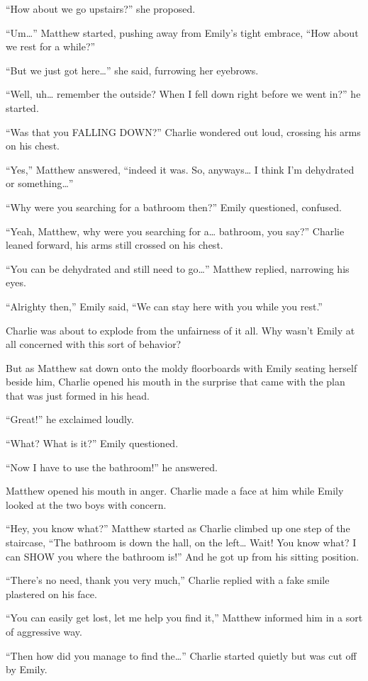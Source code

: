 “How about we go upstairs?” she proposed.

“Um…” Matthew started, pushing away from Emily's tight embrace, “How about we rest for a while?”

“But we just got here…” she said, furrowing her eyebrows.

“Well, uh… remember the outside? When I fell down right before we went in?” he started.

“Was that you FALLING DOWN?” Charlie wondered out loud, crossing his arms on his chest.

“Yes,” Matthew answered, “indeed it was. So, anyways… I think I'm dehydrated or something…”

“Why were you searching for a bathroom then?” Emily questioned, confused.

“Yeah, Matthew, why were you searching for a… bathroom, you say?” Charlie leaned forward, his arms still crossed on his chest.

“You can be dehydrated and still need to go…” Matthew replied, narrowing his eyes.

“Alrighty then,” Emily said, “We can stay here with you while you rest.”

Charlie was about to explode from the unfairness of it all. Why wasn't Emily at all concerned with this sort of behavior?

But as Matthew sat down onto the moldy floorboards with Emily seating herself beside him, Charlie opened his mouth in the surprise that came with the plan that was just formed in his head.

“Great!” he exclaimed loudly.

“What? What is it?” Emily questioned.

“Now I have to use the bathroom!” he answered.

Matthew opened his mouth in anger. Charlie made a face at him while Emily looked at the two boys with concern.

“Hey, you know what?” Matthew started as Charlie climbed up one step of the staircase, “The bathroom is down the hall, on the left… Wait! You know what? I can SHOW you where the bathroom is!” And he got up from his sitting position.

“There's no need, thank you very much,” Charlie replied with a fake smile plastered on his face.

“You can easily get lost, let me help you find it,” Matthew informed him in a sort of aggressive way.

“Then how did you manage to find the…” Charlie started quietly but was cut off by Emily.


